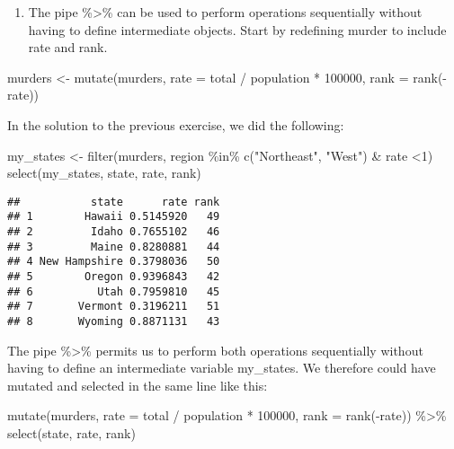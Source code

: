 \documentclass[
]{article}
\newenvironment{Shaded}{\begin{snugshade}}{\end{snugshade}}
\newcommand{\AttributeTok}[1]{\textcolor[rgb]{0.77,0.63,0.00}{#1}}
\newcommand{\DecValTok}[1]{\textcolor[rgb]{0.00,0.00,0.81}{#1}}
\newcommand{\FunctionTok}[1]{\textcolor[rgb]{0.00,0.00,0.00}{#1}}
\newcommand{\NormalTok}[1]{#1}
\newcommand{\OtherTok}[1]{\textcolor[rgb]{0.56,0.35,0.01}{#1}}
\newcommand{\SpecialCharTok}[1]{\textcolor[rgb]{0.00,0.00,0.00}{#1}}
\newcommand{\StringTok}[1]{\textcolor[rgb]{0.31,0.60,0.02}{#1}}
\providecommand{\tightlist}{%
  \setlength{\itemsep}{0pt}\setlength{\parskip}{0pt}}
\begin{document}
\begin{enumerate}
\def\labelenumi{\arabic{enumi}.}
\tightlist
\item
  The pipe \%\textgreater\% can be used to perform operations
  sequentially without having to define intermediate objects. Start by
  redefining murder to include rate and rank.
\end{enumerate}

\begin{Shaded}
\begin{Highlighting}[]
\NormalTok{murders }\OtherTok{\textless{}{-}} \FunctionTok{mutate}\NormalTok{(murders, }\AttributeTok{rate =}\NormalTok{  total }\SpecialCharTok{/}\NormalTok{ population }\SpecialCharTok{*} \DecValTok{100000}\NormalTok{, }\AttributeTok{rank =} \FunctionTok{rank}\NormalTok{(}\SpecialCharTok{{-}}\NormalTok{rate))}
\end{Highlighting}
\end{Shaded}

In the solution to the previous exercise, we did the following:

\begin{Shaded}
\begin{Highlighting}[]
\NormalTok{my\_states }\OtherTok{\textless{}{-}} \FunctionTok{filter}\NormalTok{(murders, region }\SpecialCharTok{\%in\%} \FunctionTok{c}\NormalTok{(}\StringTok{"Northeast"}\NormalTok{, }\StringTok{"West"}\NormalTok{) }\SpecialCharTok{\&}\NormalTok{ rate }\SpecialCharTok{\textless{}}\DecValTok{1}\NormalTok{)}
\FunctionTok{select}\NormalTok{(my\_states, state, rate, rank)}
\end{Highlighting}
\end{Shaded}

\begin{verbatim}
##           state      rate rank
## 1        Hawaii 0.5145920   49
## 2         Idaho 0.7655102   46
## 3         Maine 0.8280881   44
## 4 New Hampshire 0.3798036   50
## 5        Oregon 0.9396843   42
## 6          Utah 0.7959810   45
## 7       Vermont 0.3196211   51
## 8       Wyoming 0.8871131   43
\end{verbatim}

The pipe \%\textgreater\% permits us to perform both operations
sequentially without having to define an intermediate variable
my\_states. We therefore could have mutated and selected in the same
line like this:

\begin{Shaded}
\begin{Highlighting}[]
\FunctionTok{mutate}\NormalTok{(murders, }\AttributeTok{rate =}\NormalTok{  total }\SpecialCharTok{/}\NormalTok{ population }\SpecialCharTok{*} \DecValTok{100000}\NormalTok{, }\AttributeTok{rank =} \FunctionTok{rank}\NormalTok{(}\SpecialCharTok{{-}}\NormalTok{rate)) }\SpecialCharTok{\%\textgreater{}\%}
  \FunctionTok{select}\NormalTok{(state, rate, rank)}
\end{Highlighting}
\end{Shaded}
\end{document}
